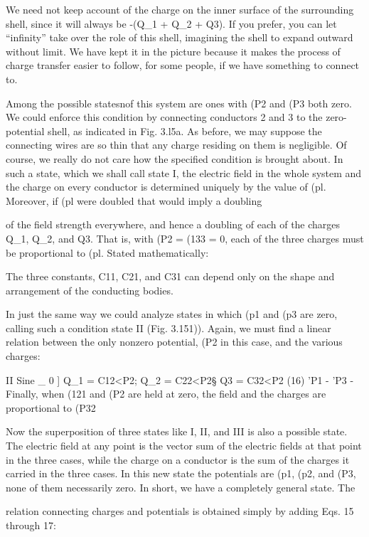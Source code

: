 We need not keep account of the charge on the inner surface of
the surrounding shell, since it will always be -(Q_1 + Q_2 + Q3).
If you prefer, you can let ``infinity'' take over the role of this shell,
imagining the shell to expand outward without limit. We have kept
it in the picture because it makes the process of charge transfer easier
to follow, for some people, if we have something to connect to.

Among the possible statesnof this system are ones with (P2 and (P3
both zero. We could enforce this condition by connecting conductors
2 and 3 to the zero-potential shell, as indicated in Fig. 3.l5a.
As before, we may suppose the connecting wires are so thin that any
charge residing on them is negligible. Of course, we really do not
care how the specified condition is brought about. In such a state,
which we shall call state I, the electric field in the whole system and
the charge on every conductor is determined uniquely by the value
of (pl. Moreover, if (pl were doubled that would imply a doubling

of the field strength everywhere, and hence a doubling of each of
the charges Q_1, Q_2, and Q3. That is, with (P2 = (133 = 0, each of the
three charges must be proportional to (pl. Stated mathematically:


The three constants, C11, C21, and C31 can depend only on the shape
and arrangement of the conducting bodies.

In just the same way we could analyze states in which (p1 and (p3
are zero, calling such a condition state II (Fig. 3.151)). Again, we
must find a linear relation between the only nonzero potential, (P2 in
this case, and the various charges:

II
Sine _ 0 ] Q_1 = C12<P2; Q_2 = C22<P2§ Q3 = C32<P2 (16)
'P1 - 'P3 -
Finally, when (121 and (P2 are held at zero, the field and the charges
are proportional to (P32



Now the superposition of three states like I, II, and III is also a
possible state. The electric field at any point is the vector sum of
the electric fields at that point in the three cases, while the charge on
a conductor is the sum of the charges it carried in the three cases.
In this new state the potentials are (p1, (p2, and (P3, none of them necessarily
zero. In short, we have a completely general state. The

relation connecting charges and potentials is obtained simply by
adding Eqs. 15 through 17:

